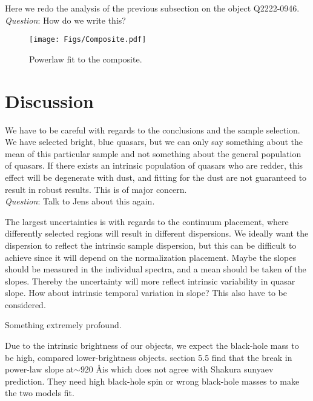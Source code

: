 \documentclass{aa}    %
\newcommand{\figlabel}[1]{\label{fig:#1}}
\newcommand{\sectlabel}[1]{\label{sect:#1}}
\newcommand{\todo}[3]{{\color{#2}\emph{#1}: #3}}
\newcommand{\qtodo}[1]{\todo{\\ Question}{red}{#1}}
\begin{document}
Here we redo the analysis of the previous subsection on the object Q2222-0946.
 \qtodo{How do we write this?}
 
 
  \begin{figure*}[hbtp]
    \centering
    \texttt{[image: Figs/Composite.pdf]}
    \caption[]{Powerlaw fit to the composite.}
    \figlabel{composite}
  \end{figure*}




\section{Discussion}  \sectlabel{discuss}



We have to be careful with regards to the conclusions and the sample selection. We have selected bright, blue quasars, but we can only say something about the mean of this particular sample and not something about the general population of quasars. If there exists an intrinsic population of quasars who are redder, this effect will be degenerate with dust, and fitting for the dust are not guaranteed to result in robust results. This is of major concern.  
\qtodo{Talk to Jens about this again}.



The largest uncertainties is with regards to the continuum placement, where differently selected regions will result in different dispersions. We ideally want the dispersion to reflect the intrinsic sample dispersion, but this can be difficult to achieve since it will depend on the normalization placement. Maybe the slopes should be measured in the individual spectra, and a mean should be taken of the slopes. Thereby the uncertainty will more reflect intrinsic variability in quasar slope. How about intrinsic temporal variation in slope? This also have to be considered. 




Something extremely profound.


Due to the intrinsic brightness of our objects, we expect the black-hole mass to be high, compared lower-brightness objects. \citet{Lusso2015} section 5.5 find that the break in power-law slope at$ \sim 920$ \AA is which does not agree with Shakura sunyaev prediction. They need high black-hole spin or wrong black-hole masses to make the two models fit.  
\end{document}

